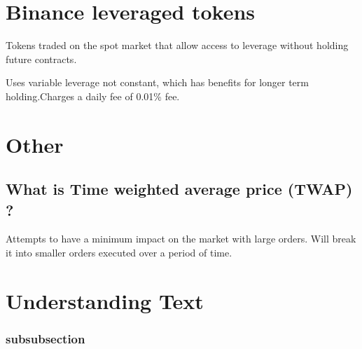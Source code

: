 \documentclass[11pt]{scrartcl} %
\begin{document}
\section{Binance leveraged tokens}

Tokens traded on the spot market that allow access to leverage without holding future contracts.

Uses variable leverage not constant, which has benefits for longer term holding.Charges a daily fee of
0.01\% fee.

\section{Other}

\subsection{What is Time weighted average price (TWAP) ?}

Attempts to have a minimum impact on the market with large orders. Will break it into smaller orders
executed over a period of time.

\section{Understanding Text}

\subsubsection{subsubsection}




\end{document}
